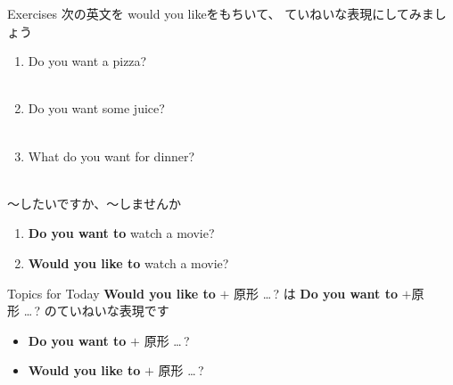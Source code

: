 \documentclass[aspectratio=169,xcolor={dvipsnames,table}]{beamer}
\begin{document}
\begin{frame}[plain]{Exercises}
次の英文を would you likeをもちいて、 ていねいな表現にしてみましょう
 \begin{enumerate}
  \item Do you want a pizza?\\
\\
  \item Do you want some juice?\\
\\
  \item What do you want for dinner?\\
\\
 \end{enumerate}

\hfill{\scriptsize {}}

\end{frame}
\begin{frame}[plain]{～したいですか、～しませんか}
\large
 \begin{enumerate}
  \item \textbf{Do you want to} watch a movie?
  \item \textbf{Would you like to} watch a movie?
 \end{enumerate}

\begin{block}{Topics for Today}\small
\textbf{Would you like to} $+$ 原形\,\,\ldots\,?\,\,は\,\,\textbf{Do you want to} $+$原形\,\,\ldots\,?\,\,のていねいな表現です
\begin{itemize}[square]\small
 \item \textbf{Do you want to} $+$ 原形 \ldots\,?
 \item \textbf{Would you like to} $+$ 原形 \ldots\,?
       \end{itemize}
\end{block}
\hfill{\scriptsize {}}

\end{frame}
\end{document}
